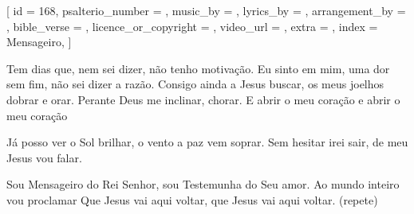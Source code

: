 
[
    id                     = {168},
    psalterio_number       = {},
    music_by               = {},
    lyrics_by              = {},
    arrangement_by         = {},
    bible_verse            = {},
    licence_or_copyright   = {},
    video_url              = {},
    extra                  = {},
    index                  = {Mensageiro},
]


\beginverse

Tem dias que, nem sei dizer, não tenho motivação. 
Eu sinto em mim, uma dor sem fim, não sei dizer a razão. 
Consigo ainda a Jesus buscar,  os meus joelhos dobrar e orar. 
Perante Deus me inclinar, chorar. 
E abrir o meu coração e abrir o meu coração

\endverse


\beginchorus

Já posso ver o Sol brilhar, o vento a paz vem soprar. 
Sem hesitar irei sair, de meu Jesus vou falar. 

\endchorus


\beginverse

Sou Mensageiro do Rei Senhor, sou Testemunha do Seu amor. 
Ao mundo inteiro vou proclamar
Que Jesus vai aqui voltar, que Jesus vai aqui voltar. (repete)

\endverse



\endsong
